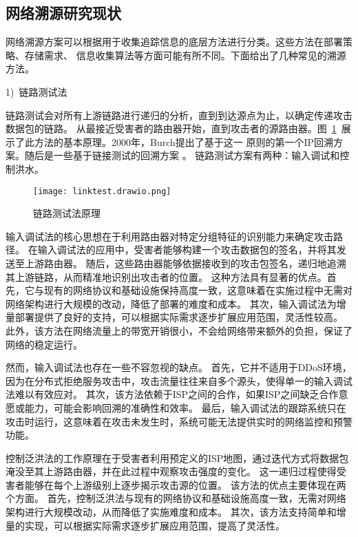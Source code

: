 \subsection{网络溯源研究现状}
网络溯源方案可以根据用于收集追踪信息的底层方法进行分类。这些方法在部署策略、存储需求、
信息收集算法等方面可能有所不同。下面给出了几种常见的溯源方法\cite{singh2016}。\par

1)~链路测试法\par
链路测试会对所有上游链路进行递归的分析，直到到达源点为止，以确定传递攻击数据包的链路。
从最接近受害者的路由器开始，直到攻击者的源路由器。图~\ref{fig:linktest}~展示了此方法的基本原理。2000年，Burch提出了基于这一
原则的第一个IP回溯方案\cite{Burch2000Tracing}。随后是一些基于链接测试的回溯方案
\cite{HamediHamzehkolaie2012DOSTraceback,ShiYang2005DDoSDefense,
ThingSlomanDulay2008DDoSDetection}。
链路测试方案有两种：输入调试和控制洪水。
\begin{figure}[htbp]
  \centering
  \texttt{[image: linktest.drawio.png]}
  \caption{链路测试法原理}
  \label{fig:linktest}
\end{figure}

输入调试法的核心思想在于利用路由器对特定分组特征的识别能力来确定攻击路径。
在输入调试法的应用中，受害者能够构建一个攻击数据包的签名，并将其发送至上游路由器。
随后，这些路由器能够依据接收到的攻击包签名，递归地追溯其上游链路，从而精准地识别出攻击者的位置。
这种方法具有显著的优点。首先，它与现有的网络协议和基础设施保持高度一致，这意味着在实施过程中无需对网络架构进行大规模的改动，降低了部署的难度和成本。
其次，输入调试法为增量部署提供了良好的支持，可以根据实际需求逐步扩展应用范围，灵活性较高。
此外，该方法在网络流量上的带宽开销很小，不会给网络带来额外的负担，保证了网络的稳定运行。

然而，输入调试法也存在一些不容忽视的缺点。
首先，它并不适用于DDoS环境，因为在分布式拒绝服务攻击中，攻击流量往往来自多个源头，使得单一的输入调试法难以有效应对。
其次，该方法依赖于ISP之间的合作，如果ISP之间缺乏合作意愿或能力，可能会影响回溯的准确性和效率。
最后，输入调试法的跟踪系统只在攻击时运行，这意味着在攻击未发生时，系统可能无法提供实时的网络监控和预警功能。

控制泛洪法的工作原理在于受害者利用预定义的ISP地图，通过迭代方式将数据包淹没至其上游路由器，并在此过程中观察攻击强度的变化。
这一递归过程使得受害者能够在每个上游级别上逐步揭示攻击源的位置。
该方法的优点主要体现在两个方面。
首先，控制泛洪法与现有的网络协议和基础设施高度一致，无需对网络架构进行大规模改动，从而降低了实施难度和成本。
其次，该方法支持简单和增量的实现，可以根据实际需求逐步扩展应用范围，提高了灵活性。

